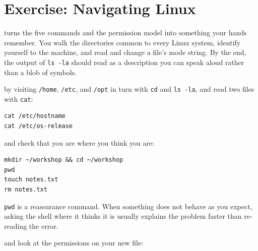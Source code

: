 \section{Exercise: Navigating Linux}

 turns the five commands and the permission model into something your hands remember. You walk the directories common to every Linux system, identify yourself to the machine, and read and change a file's mode string. By the end, the output of \texttt{ls -la} should read as a description you can speak aloud rather than a blob of symbols.

 by visiting \texttt{/home}, \texttt{/etc}, and \texttt{/opt} in turn with \texttt{cd} and \texttt{ls -la}, and read two files with \texttt{cat}:

\begin{verbatim}
cat /etc/hostname
cat /etc/os-release
\end{verbatim}


 and check that you are where you think you are:

\begin{verbatim}
mkdir ~/workshop && cd ~/workshop
pwd
touch notes.txt
rm notes.txt
\end{verbatim}

\texttt{pwd} is a reassurance command. When something does not behave as you expect, asking the shell where it thinks it is usually explains the problem faster than re-reading the error.

 and look at the permissions on your new file:

